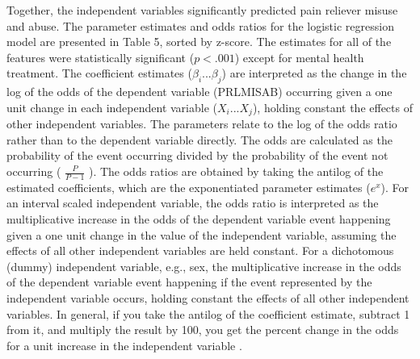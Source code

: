 \documentclass[sigconf]{acmart}
\begin{document}
Together, the independent variables significantly predicted pain reliever 
misuse and abuse. The parameter estimates and odds ratios for the logistic 
regression model are presented in Table 5, sorted by z-score. The estimates 
for all of the features were statistically significant ($p<.001$) except for 
mental health treatment. The coefficient estimates ($\beta_i$...$\beta_j$) 
are interpreted as the change in the log of the odds of the dependent variable 
(PRLMISAB) occurring given a one unit change in each independent variable
($X_i$...$X_j$), holding constant the effects of other independent variables. 
The parameters relate to the log of the odds ratio rather than to the dependent 
variable directly. The odds are calculated as the probability of the event 
occurring divided by the probability of the event not occurring 
( \(\frac{P}{P-1}\) ). The odds ratios are obtained by taking the antilog of 
the estimated coefficients, which are the exponentiated parameter estimates 
($e^x$). For an interval scaled independent variable, the odds ratio 
is interpreted as the multiplicative increase in the odds of the dependent 
variable event happening given a one unit change in the value of the 
independent variable, assuming the effects of all other independent variables 
are held constant. For a dichotomous (dummy) independent variable, e.g., sex, 
the multiplicative increase in the odds of the dependent variable event 
happening if the event represented by the independent variable occurs, holding 
constant the effects of all other independent variables. In general, if you 
take the antilog of the coefficient estimate, subtract 1 from it, and multiply 
the result by 100, you get the percent change in the odds for a unit increase 
in the independent variable  \cite{gujarati09}.  

\end{document}
